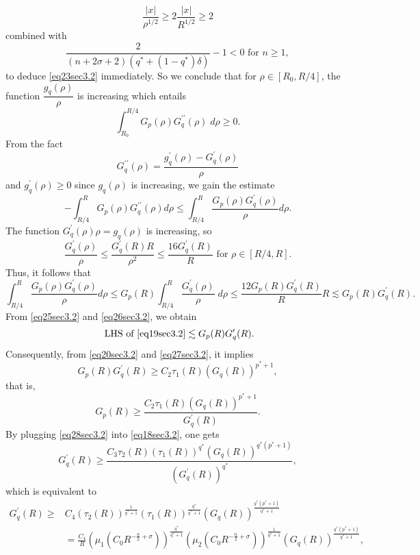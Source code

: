 \documentclass[11pt,reqno]{amsart}
\newcommand{\di}{\displaystyle}
\numberwithin{equation}{section}
\theoremstyle{plain}
\begin{document}
\[
\frac{|x|}{\rho^{1/2}}\geq 2\frac{|x|}{R^{1/2}}\geq 2
\]
combined with
\[
\frac{2}{(n+2\sigma+2)(q^*+(1-q^*)\delta)}-1<0\text{ for $n\geq 1$},
\]
to deduce \eqref{eq23sec3.2} immediately. So we conclude that for $\rho\in \left[R_0,R/4\right]$, the function $\dfrac{g_q(\rho)}{\rho}$ is increasing which entails
\begin{equation}\label{eq24sec3.2}
\int^{R/4}_{R_0}G_p(\rho)G_q^{\prime \prime}(\rho)\;d\rho\geq 0.
\end{equation}
From the fact
\[
G^{\prime \prime}_q(\rho)=\frac{g_q^{\prime}(\rho)-G^{\prime}_q(\rho)}{\rho}
\]
and $g_q^{\prime}(\rho)\geq 0$ since $g_q(\rho)$ is increasing, we gain the estimate
\begin{equation}\label{eq25sec3.2}
-\di\int^R_{R/4} G_p(\rho) G_q^{\prime \prime}(\rho) d\rho\leq\int^R_{R/4} \frac{G_p(\rho)G_q^{\prime}(\rho)}{\rho} d\rho.
\end{equation}
The function $G_q^{\prime}(\rho)\rho=g_q(\rho)$ is increasing, so
\[
\frac{G_q^{\prime}(\rho)}{\rho}\leq \frac{G_q^{\prime}(R)R}{\rho^2}\leq \frac{16G_q^{\prime}(R)}{R}\text{ for $\rho\in \left[R/4,R\right]$}.
\]
Thus, it follows that
\begin{equation}\label{eq26sec3.2}
\int^R_{R/4} \frac{G_p(\rho)G_q^{\prime}(\rho)}{\rho} d\rho\leq G_p(R)\int^{R}_{ R/4}\frac{G^{\prime}_q(\rho)}{\rho}\;d \rho\leq \frac{12G_p(R)G^{\prime}_q(R)}{R}R\lesssim G_p(R)G^{\prime}_q(R).
\end{equation}
From \eqref{eq25sec3.2} and \eqref{eq26sec3.2}, we obtain 
\begin{equation}\label{eq27sec3.2}
\text { LHS of }\eqref{eq19sec3.2} \lesssim G_p(R) G_q^{\prime}(R).
\end{equation}
Consequently, from \eqref{eq20sec3.2} and \eqref{eq27sec3.2}, it implies
$$
G_p(R) G_q^{\prime}(R) \geq C_2 \tau_1(R)\left(G_q(R)\right)^{p^*+1},
$$
that is,
\begin{equation}\label{eq28sec3.2}
G_p(R) \geq \frac{C_2 \tau_1(R)\left(G_q(R)\right)^{p^*+1}}{G_q^{\prime}(R)} .
\end{equation}
By plugging \eqref{eq28sec3.2} into \eqref{eq18sec3.2}, one gets
$$
G_q^{\prime}(R) \geq \frac{C_3 \tau_2(R)\left(\tau_1(R)\right)^{q^*}\left(G_q(R)\right)^{q^*\left(p^*+1\right)}}{\left(G_q^{\prime}(R)\right)^{q^*}},
$$
which is equivalent to
$$
\begin{aligned}
G_q^{\prime}(R) \geq & C_4\left(\tau_2(R)\right)^{\frac{1}{q^*+1}}\left(\tau_1(R)\right)^{\frac{q^*}{q^*+1}}\left(G_q(R)\right)^{\frac{q^*\left(p^*+1\right)}{q^*+1}} \\
& =\frac{C_4}{R}\left(\mu_1\left(C_0 R^{-\frac{n}{2}+\sigma}\right)\right)^{\frac{q^*}{q^*+1}}\left(\mu_2\left(C_0 R^{-\frac{n}{2}+\sigma}\right)\right)^{\frac{1}{q^*+1}}\left(G_q(R)\right)^{\frac{q^*\left(p^*+1\right)}{q^*+1}},
\end{aligned}
$$
\end{document}
